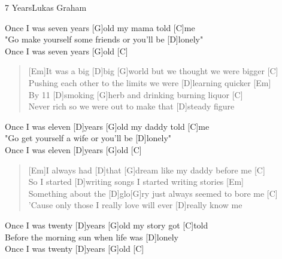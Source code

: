 \begin{song}{7 Years}{Lukas Graham}

    \begin{intro}
        [Em G C D Em G C]
    \end{intro}
    
    \begin{chorus}
        [Em]Once I was seven years [G]old my mama told [C]me\\
        "Go make yourself some friends or you'll be [D]lonely"\\
        [Em]Once I was seven years [G]old [C]
    \end{chorus}
    
    \begin{verse}
        [Em]It was a big [D]big [G]world but we thought we were bigger [C]\\
        Pushing each other to the limits we were [D]learning quicker [Em]\\
        By 11 [D]smoking [G]herb and drinking burning liquor [C]\\
        Never rich so we were out to make that [D]steady figure
    \end{verse}
    
    \begin{chorus}
        [Em]Once I was eleven [D]years [G]old my daddy told [C]me\\
        "Go get yourself a wife or you'll be [D]lonely"\\
        [Em]Once I was eleven [D]years [G]old [C]
    \end{chorus}
    
    \begin{verse}
        [Em]I always had [D]that [G]dream like my daddy before me [C]\\
        So I started [D]writing songs I started writing stories [Em]\\
        Something about the [D]glo[G]ry just always seemed to bore me [C]\\
        'Cause only those I really love will ever [D]really know me
    \end{verse}
    
    \begin{chorus}
        [Em]Once I was twenty [D]years [G]old my story got [C]told\\
        Before the morning sun when life was [D]lonely\\
        [Em]Once I was twenty [D]years [G]old [C]
    \end{chorus}
    

\end{song}
